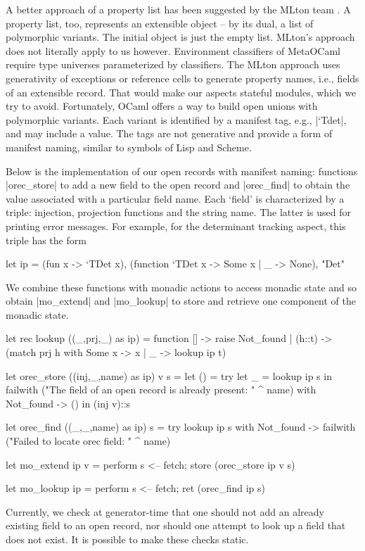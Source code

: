 \documentclass[draft]{elsart}
\begin{document}
A better approach of a property list has been suggested by the MLton
team \cite{mlton-proplist}. A property list, too, represents an
extensible object -- by its dual, a list of polymorphic variants.  The
initial object is just the empty list. MLton's approach does not
literally apply to us however. Environment classifiers of MetaOCaml
require type universes parameterized by classifiers. The MLton
approach uses generativity of exceptions or reference cells to
generate property names, i.e., fields of an extensible record. That
would make our aspects stateful modules, which we try to
avoid. Fortunately, OCaml offers a way to build open unions with
polymorphic variants. Each variant is identified by a manifest tag,
e.g., |`Tdet|, and may include a value. The tags are not generative and
provide a form of manifest naming, similar to symbols of
Lisp and Scheme.

Below is the implementation of our open records with manifest
naming: functions |orec_store| to add a new field to the open record
and |orec_find| to obtain the value associated with a particular field
name. Each `field' is characterized by a triple: injection, 
projection functions and the string name. The latter is used for 
printing error messages. For example, for the
determinant tracking aspect, this triple has the form
\begin{code}
let ip = 
  (fun x -> `TDet x), (function `TDet x -> Some x | _ -> None), "Det"
\end{code}
We combine these functions with monadic
actions to access monadic state and so obtain 
|mo_extend| and |mo_lookup| to store and retrieve one component 
of the monadic state.
\begin{code}
let rec lookup ((_,prj,_) as ip) = 
   function [] -> raise Not_found
   | (h::t) -> (match prj h with Some x -> x | _ -> lookup ip t)

let orec_store ((inj,_,name) as ip) v s =
  let () = 
    try let _ = lookup ip s in 
        failwith ("The field of an open record is already present: " ^ name)
    with Not_found -> () in
  (inj v)::s

let orec_find ((_,_,name) as ip) s =
  try lookup ip s 
  with Not_found -> failwith ("Failed to locate orec field: " ^ name)

let mo_extend ip v = 
  perform s <-- fetch; store (orec_store ip v s)

let mo_lookup ip = perform s <-- fetch; ret (orec_find ip s)
\end{code}
%
Currently, we check at generator-time that one should not add an
already existing field to an open record, nor should one attempt to
look up a field that does not exist. It is possible to make these
checks static.
\end{document}
